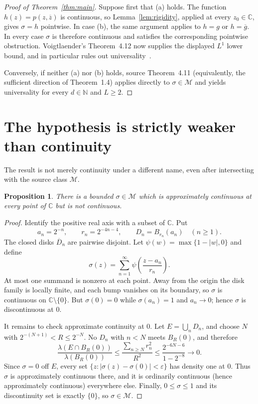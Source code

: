 \documentclass[11pt]{article}
\newtheorem{proposition}[theorem]{Proposition}
\theoremstyle{remark}
\newcommand{\C}{\mathbb C}
\newcommand{\N}{\mathbb N}
\newcommand{\M}{\mathcal M}
\begin{document}
\begin{proof}[Proof of Theorem~\ref{thm:main}]
Suppose first that (a) holds.  The function
$h(z)=p(z,\overline z)$ is continuous, so Lemma~\ref{lem:rigidity}, applied
at every $z_0\in\C$, gives $\sigma=h$ pointwise.  In case (b), the same
argument applies to $h=g$ or $h=\overline g$.  In every case $\sigma$ is
therefore continuous and satisfies the corresponding pointwise obstruction.
Voigtlaender's Theorem~4.12 now supplies the displayed $L^1$ lower bound,
and in particular rules out universality~\cite{source}.

Conversely, if neither (a) nor (b) holds, source Theorem~4.11 (equivalently,
the sufficient direction of Theorem~1.4) applies directly to
$\sigma\in\M$ and yields universality for every $d\in\N$ and $L\ge2$.
\end{proof}

\section{The hypothesis is strictly weaker than continuity}

The result is not merely continuity under a different name, even after
intersecting with the source class $\M$.

\begin{proposition}
There is a bounded $\sigma\in\M$ which is approximately continuous at every
point of $\C$ but is not continuous.
\end{proposition}

\begin{proof}
Identify the positive real axis with a subset of $\C$.  Put
\[
 a_n=2^{-n},\qquad r_n=2^{-4n-4},\qquad
 D_n=B_{r_n}(a_n) \quad(n\ge1).
\]
The closed disks $\overline D_n$ are pairwise disjoint.  Let
$\psi(w)=\max\{1-|w|,0\}$ and define
\[
 \sigma(z)=\sum_{n=1}^{\infty}
 \psi\!\left(\frac{z-a_n}{r_n}\right).
\]
At most one summand is nonzero at each point.  Away from the origin the disk
family is locally finite, and each bump vanishes on its boundary, so $\sigma$
is continuous on $\C\setminus\{0\}$.  But $\sigma(0)=0$ while
$\sigma(a_n)=1$ and $a_n\to0$; hence $\sigma$ is discontinuous at $0$.

It remains to check approximate continuity at $0$.  Let
$E=\bigcup_nD_n$, and choose $N$ with
$2^{-(N+1)}<R\le2^{-N}$.  No $D_n$ with $n<N$ meets $B_R(0)$, and therefore
\[
 \frac{\lambda(E\cap B_R(0))}{\lambda(B_R(0))}
 \le
 \frac{\sum_{n\ge N}r_n^2}{R^2}
 \le \frac{2^{-6N-6}}{1-2^{-8}}\longrightarrow0.
\]
Since $\sigma=0$ off $E$, every set
$\{z:|\sigma(z)-\sigma(0)|<\varepsilon\}$ has density one at $0$.
Thus $\sigma$ is approximately continuous there, and it is ordinarily
continuous (hence approximately continuous) everywhere else.  Finally,
$0\le\sigma\le1$ and its discontinuity set is exactly $\{0\}$, so
$\sigma\in\M$.
\end{proof}
\end{document}

